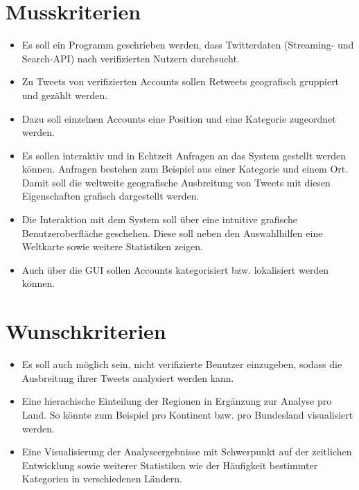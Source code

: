 
\section{Musskriterien}
\begin{itemize}
	\item Es soll ein Programm geschrieben werden, dass Twitterdaten (Streaming- und Search-API) nach verifizierten Nutzern durchsucht.
	\item Zu Tweets von verifizierten Accounts sollen Retweets geografisch gruppiert und gezählt werden.
	\item Dazu soll einzelnen Accounts eine Position und eine Kategorie zugeordnet werden.
	\item Es sollen interaktiv und in Echtzeit Anfragen an das System gestellt werden können. Anfragen bestehen zum Beispiel aus einer Kategorie und einem Ort. Damit soll die weltweite geografische Ausbreitung von Tweets mit diesen Eigenschaften grafisch dargestellt werden.
	\item Die Interaktion mit dem System soll über eine intuitive grafische Benutzeroberfläche geschehen. Diese soll neben den Auswahlhilfen eine Weltkarte sowie weitere Statistiken zeigen.
	\item Auch über die GUI sollen Accounts kategorisiert bzw. lokalisiert werden können.
\end{itemize}

\section{Wunschkriterien}
\begin{itemize}
	\item Es soll auch möglich sein, nicht verifizierte Benutzer einzugeben, sodass die Ausbreitung ihrer Tweets analysiert werden kann.
	\item Eine hierachische Einteilung der Regionen in Ergänzung zur Analyse pro Land. So könnte zum Beispiel pro Kontinent bzw. pro Bundesland visualisiert werden.
	\item Eine Visualisierung der Analyseergebnisse mit Schwerpunkt auf der zeitlichen Entwicklung sowie weiterer Statistiken wie der Häufigkeit bestimmter Kategorien in verschiedenen Ländern.
\end{itemize}

